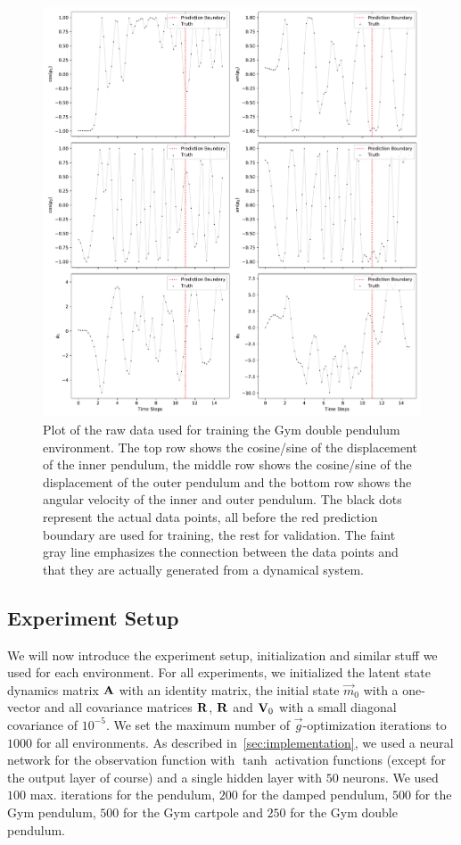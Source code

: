 			\begin{figure}
				\centering
				\includegraphics[width=\linewidth]{figures/experiments/environments/observations-acrobot-gym-N0.pdf}
				\caption{Plot of the raw data used for training the Gym double pendulum environment. The top row shows the cosine/sine of the displacement of the inner pendulum, the middle row shows the cosine/sine of the displacement of the outer pendulum and the bottom row shows the angular velocity of the inner and outer pendulum. The black dots represent the actual data points, all before the red prediction boundary are used for training, the rest for validation. The faint gray line emphasizes the connection between the data points and that they are actually generated from a dynamical system.}
				\label{fig:envDoublePendulumGym}
			\end{figure}

	\subsection{Experiment Setup}
		We will now introduce the experiment setup, initialization and similar stuff we used for each environment. For all experiments, we initialized the latent state dynamics matrix \( \boldsymbol{\mathrm{A}} \) with an identity matrix, the initial state \( \vec{m}_0 \) with a one-vector and all covariance matrices \( \boldsymbol{\mathrm{R}} \), \( \boldsymbol{\mathrm{R}} \) and \( \boldsymbol{\mathrm{V}}_0 \) with a small diagonal covariance of \( 10^{-5} \). We set the maximum number of \(\vec{g}\)-optimization iterations to \(1000\) for all environments. As described in~\autoref{sec:implementation}, we used a neural network for the observation function with \(\tanh\) activation functions (except for the output layer of course) and a single hidden layer with \(50\) neurons. We used \(100\) max. iterations for the pendulum, \(200\) for the damped pendulum, \(500\) for the Gym pendulum, \(500\) for the Gym cartpole and \(250\) for the Gym double pendulum.

